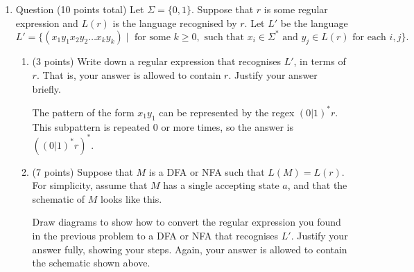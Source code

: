 \documentclass{amsart}
\begin{document}
\begin{enumerate}
\begin{enumerate}
\begin{solution}
\begin{center}
      \end{center}
\end{solution}
\end{enumerate}
\item Question (10 points total)
\label{sec:orgb417a9e}
Let \(\Sigma = \{0,1\}\).
Suppose that \(r\) is some regular expression and \(L(r)\) is the language recognised by \(r\).
Let \(L'\) be the language
\[L' = \{(x_1 y_1 x_2 y_2 \ldots x_k y_k) \mid \text{ for some } k \geq 0, \text{ such that }x_i \in \Sigma^\ast\text{ and } y_j \in L(r)\text{ for each }i,j\}.\]
\begin{enumerate}
\item (3 points) Write down a regular expression that recognises \(L'\), in terms of \(r\).
That is, your answer is allowed to contain \(r\). Justify your answer briefly.
\begin{solution}
The pattern of the form \(x_1 y_1\) can be represented by the regex \((0|1)^\ast r\).
This subpattern is repeated \(0\) or more times, so the answer is \(((0|1)^\ast r)^\ast\).
\end{solution}
\item (7 points) Suppose that \(M\) is a DFA or NFA such that \(L(M) = L(r)\). For simplicity, assume that \(M\) has a single accepting state \(a\), and that the schematic of \(M\) looks like this.
\begin{center}
\end{center}
Draw diagrams to show how to convert the regular expression you found in the previous problem to a DFA or NFA that recognises \(L'\).
Justify your answer fully, showing your steps.
Again, your answer is allowed to contain the schematic shown above.
\end{enumerate}
\begin{solution}

\end{solution}
\end{enumerate}
\end{document}
